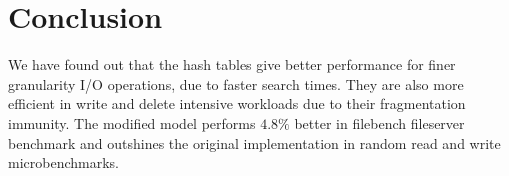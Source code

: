 \documentclass[letterpaper,twocolumn, 11pt]{article}
\begin{document}


\section{Conclusion} \label{conclusion}
\vspace{-0.2cm}
We have found out that the hash tables give better performance for finer granularity I/O operations, due to faster search times. They are also more efficient in write and delete intensive workloads due to their fragmentation immunity. The modified model performs $4.8\%$ better in filebench fileserver benchmark and outshines the original implementation in random read and write microbenchmarks.



\end{document}
